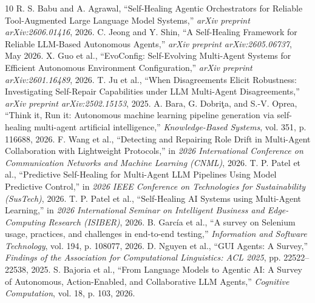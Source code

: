 \documentclass[conference]{IEEEtran}
\begin{document}
\begin{thebibliography}{10}
 R. S. Babu and A. Agrawal, ``Self-Healing Agentic Orchestrators for Reliable Tool-Augmented Large Language Model Systems,'' \textit{arXiv preprint arXiv:2606.01416}, 2026.
 C. Jeong and Y. Shin, ``A Self-Healing Framework for Reliable LLM-Based Autonomous Agents,'' \textit{arXiv preprint arXiv:2605.06737}, May 2026.
 X. Guo et al., ``EvoConfig: Self-Evolving Multi-Agent Systems for Efficient Autonomous Environment Configuration,'' \textit{arXiv preprint arXiv:2601.16489}, 2026.
 T. Ju et al., ``When Disagreements Elicit Robustness: Investigating Self-Repair Capabilities under LLM Multi-Agent Disagreements,'' \textit{arXiv preprint arXiv:2502.15153}, 2025.
 A. Bara, G. Dobri\c{t}a, and S.-V. Oprea, ``Think it, Run it: Autonomous machine learning pipeline generation via self-healing multi-agent artificial intelligence,'' \textit{Knowledge-Based Systems}, vol. 351, p. 116688, 2026.
 F. Wang et al., ``Detecting and Repairing Role Drift in Multi-Agent Collaboration with Lightweight Protocols,'' in \textit{2026 International Conference on Communication Networks and Machine Learning (CNML)}, 2026.
 T. P. Patel et al., ``Predictive Self-Healing for Multi-Agent LLM Pipelines Using Model Predictive Control,'' in \textit{2026 IEEE Conference on Technologies for Sustainability (SusTech)}, 2026.
 T. P. Patel et al., ``Self-Healing AI Systems using Multi-Agent Learning,'' in \textit{2026 International Seminar on Intelligent Business and Edge-Computing Research (ISIBER)}, 2026.
 B. Garc\'ia et al., ``A survey on Selenium usage, practices, and challenges in end-to-end testing,'' \textit{Information and Software Technology}, vol. 194, p. 108077, 2026.
 D. Nguyen et al., ``GUI Agents: A Survey,'' \textit{Findings of the Association for Computational Linguistics: ACL 2025}, pp. 22522--22538, 2025.
 S. Bajoria et al., ``From Language Models to Agentic AI: A Survey of Autonomous, Action-Enabled, and Collaborative LLM Agents,'' \textit{Cognitive Computation}, vol. 18, p. 103, 2026.
\end{thebibliography}
\end{document}
